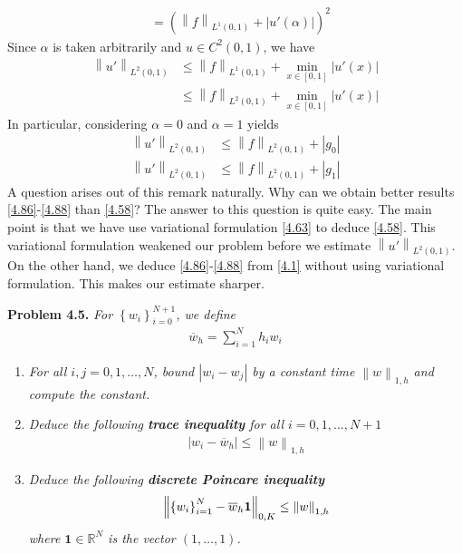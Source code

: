 \documentclass[a4paper]{article}
\numberwithin{equation}{section}
\begin{document}
\begin{enumerate}
\begin{align}
& = {\left( {{{\left\| f \right\|}_{{L^1}\left( {0,1} \right)}} + \left| {u'\left( \alpha  \right)} \right|} \right)^2}
\end{align}
Since $\alpha$ is taken arbitrarily and $u\in C^2 \left(0,1\right)$, we have
\begin{align}
{\left\| {u'} \right\|_{{L^2}\left( {0,1} \right)}} &\le {\left\| f \right\|_{{L^1}\left( {0,1} \right)}} + \mathop {\min }\limits_{x \in \left[ {0,1} \right]} \left| {u'\left( x \right)} \right|\\
& \le {\left\| f \right\|_{{L^2}\left( {0,1} \right)}} + \mathop {\min }\limits_{x \in \left[ {0,1} \right]} \left| {u'\left( x \right)} \right| \label{4.86}
\end{align}
In particular, considering $\alpha =0$ and $\alpha =1$ yields
\begin{align}
\label{4.87}
{\left\| {u'} \right\|_{{L^2}\left( {0,1} \right)}} &\le {\left\| f \right\|_{{L^2}\left( {0,1} \right)}} + \left| {{g_0}} \right|\\
{\left\| {u'} \right\|_{{L^2}\left( {0,1} \right)}} &\le {\left\| f \right\|_{{L^2}\left( {0,1} \right)}} + \left| {{g_1}} \right| \label{4.88}
\end{align}
A question arises out of this remark naturally. Why can we obtain better results \eqref{4.86}-\eqref{4.88} than \eqref{4.58}? The answer to this question is quite easy. The main point is that we have use variational formulation \eqref{4.63} to deduce \eqref{4.58}. This variational formulation weakened our problem before we estimate ${\left\| {u'} \right\|_{{L^2}\left( {0,1} \right)}}$. On the other hand, we deduce \eqref{4.86}-\eqref{4.88} from \eqref{4.1} without using variational formulation. This makes our estimate sharper.
\end{enumerate}
\textbf{Problem 4.5.} \textit{For $\left\{ {{w_i}} \right\}_{i = 0}^{N+1}$, we define}
\begin{align}
{\overline w _h} = \sum\limits_{i = 1}^N {{h_i}{w_i}} 
\end{align}
\begin{enumerate}
\item \textit{For all $i,j=0,1,\ldots,N$, bound $\left| {{w_i} - {w_j}} \right|$ by a constant time ${\left\| w \right\|_{1,h}}$ and compute the constant.}
\item \textit{Deduce the following \textbf{trace inequality} for all $i=0,1,\ldots,N+1$}
\begin{align}
\label{4.90}
\left| {{w_i} - {{\overline{w}}_h}} \right| \le {\left\| w \right\|_{1,h}}
\end{align}
\item \textit{Deduce the following \textbf{discrete Poincare inequality}}
\begin{align}
\label{4.91}
{\left\| {\left\{ {{w_i}} \right\}_{i = 1}^N - {{\overline{w}}_h}{\bf{1}}} \right\|_{0,K}} \le {\left\| w \right\|_{1,h}}
\end{align}
\textit{where $\mathbf{1}\in \mathbb{R}^N$ is the vector $\left(1,\ldots,1\right)$.}
\end{enumerate}
\end{document}
